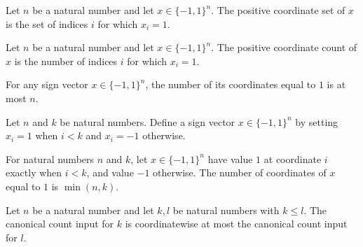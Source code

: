 \begin{definition}
\label{FABL.positiveCoordinateSet}
\leanok
Let $n$ be a natural number and let $x\in\{-1,1\}^n$. The positive coordinate set of $x$
is the set of indices $i$ for which $x_i=1$.
\end{definition}

\begin{definition}
\label{FABL.positiveCoordinateCount}
\leanok
{}
Let $n$ be a natural number and let $x\in\{-1,1\}^n$. The positive coordinate count of
$x$ is the number of indices $i$ for which $x_i=1$.
\end{definition}

\begin{theorem}
\label{FABL.positiveCoordinateCount_le}
\leanok
{}
For any sign vector $x\in\{-1,1\}^n$, the number of its coordinates equal to $1$ is
at most $n$.
\end{theorem}

\begin{definition}
\label{FABL.canonicalCountInput}
\leanok
Let $n$ and $k$ be natural numbers. Define a sign vector $x\in\{-1,1\}^n$ by setting
$x_i=1$ when $i<k$ and $x_i=-1$ otherwise.
\end{definition}

\begin{theorem}
\label{FABL.positiveCoordinateCount_canonicalCountInput}
\leanok
{}
For natural numbers $n$ and $k$, let $x\in\{-1,1\}^n$ have value $1$ at coordinate
$i$ exactly when $i<k$, and value $-1$ otherwise. The number of coordinates of $x$ equal
to $1$ is $\min(n,k)$.
\end{theorem}

\begin{theorem}
\label{FABL.canonicalCountInput_mono}
\leanok
{}
Let $n$ be a natural number and let $k,l$ be natural numbers with $k\le l$. The
canonical count input for $k$ is coordinatewise at most the canonical count input for
$l$.
\end{theorem}

